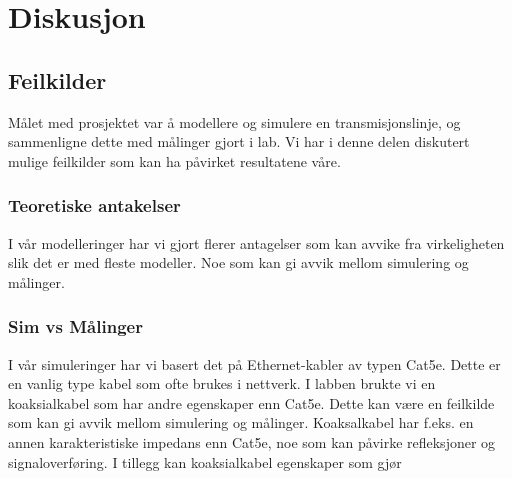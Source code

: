 \section{Diskusjon}
\subsection{Feilkilder}
Målet med prosjektet var å modellere og simulere en transmisjonslinje, og sammenligne dette med målinger gjort i lab. Vi har i denne delen diskutert mulige feilkilder som kan ha påvirket resultatene våre.
\subsubsection{Teoretiske antakelser}
I vår modelleringer har vi gjort flerer antagelser som kan avvike fra virkeligheten slik det er med fleste modeller. Noe som kan gi avvik mellom simulering og målinger. 
\subsubsection{Sim vs Målinger}
I vår simuleringer har vi basert det på Ethernet-kabler av typen Cat5e. Dette er en vanlig type kabel som ofte brukes i nettverk. I labben brukte vi en koaksialkabel som har andre egenskaper enn Cat5e. Dette kan være en feilkilde som kan gi avvik mellom simulering og målinger. Koaksalkabel har f.eks. en annen karakteristiske impedans enn Cat5e, noe som kan påvirke refleksjoner og signaloverføring. I tillegg kan koaksialkabel egenskaper som gjør 